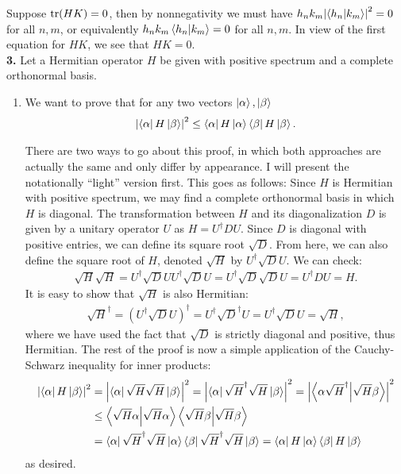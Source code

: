 \documentclass{article}
\theoremstyle{definition}
\newcommand{\al}{\alpha}
\newcommand{\be}{\beta}
\newcommand{\lp}{\left(}
\newcommand{\rp}{\right)}
\begin{document}
Suppose $\tr(HK) = 0$, then by nonnegativity we must have $h_n k_m \abs{\bra{h_n}\ket{k_m}}^2 = 0$ for all $n,m$, or equivalently $h_nk_m \bra{h_n}\ket{k_m} = 0$ for all $n,m$. In view of the first equation for $HK$, we see that $HK= 0$.  \\













\noindent \textbf{3.} Let a Hermitian operator $H$ be given with positive spectrum and a complete orthonormal basis. 

\begin{enumerate}[label=(\alph*)]
	\item We want to prove that for any two vectors $\ket{\al}, \ket{\be}$ 
	\begin{align*}
	\abs{\bra{\al} H \ket{\be}}^2 \leq \bra{\al}H \ket{\al} \bra{\be} H \ket{\be}.
	\end{align*}
	
	There are two ways to go about this proof, in which both approaches are actually the same and only differ by appearance. I will present the notationally ``light'' version first. This goes as follows: Since $H$ is Hermitian with positive spectrum, we may find a complete orthonormal basis in which $H$ is diagonal. The transformation between $H$ and its diagonalization $D$ is given by a unitary operator $U$ as $H  = U^\dagger D U$. Since $D$ is diagonal with positive entries, we can define its square root $\sqrt{D}$. From here, we can also define the square root of $H$, denoted $\sqrt{H}$ by $U^\dagger \sqrt{D} U$. We can check:
	\begin{align*}
	\sqrt{H} \sqrt{H} = U^\dagger \sqrt{D} U U^\dagger \sqrt{D} U = U^\dagger \sqrt{D}\sqrt{D} U = U^\dagger D U = H.
	\end{align*}
	It is easy to show that $\sqrt{H}$ is also Hermitian: 
	\begin{align*}
	\sqrt{H}^\dagger = \lp U^\dagger \sqrt{D} U \rp^\dagger  = U^\dagger \sqrt{D}^\dagger U = U^\dagger \sqrt{D} U = \sqrt{H}, 
	\end{align*}
	where we have used the fact that $\sqrt{D}$ is strictly diagonal and positive, thus Hermitian. The rest of the proof is now a simple application of the Cauchy-Schwarz inequality for inner products:
	\begin{align*}
	\abs{\bra{\al} H \ket{\be}}^2 &= \abs{ \bra{\al} \sqrt{H}\sqrt{H} \ket{\be} }^2 = \abs{ \bra{\al} \sqrt{H}^\dagger \sqrt{H} \ket{\be} }^2 =  \abs{ \bra{\al \sqrt{H}^\dagger}\ket{ \sqrt{H}\be} }^2 \\
	&\leq \braket{\sqrt{H}\al} \braket{\sqrt{H} \be}\\
	&= \bra{\al} \sqrt{H}^\dagger\sqrt{H}\ket{\al} \bra{\be}\sqrt{H}^\dagger\sqrt{H}\ket{ \be}= \bra{\al} {H}\ket{\al} \bra{\be}{H}\ket{ \be}
	\end{align*}
	as desired.\\
	

\end{enumerate}
\end{document}
